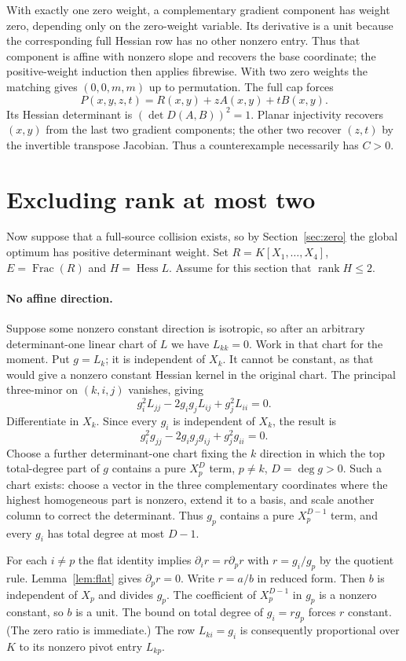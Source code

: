 \documentclass[11pt,a4paper]{article}
\newcommand{\Hess}{\operatorname{Hess}}
\newcommand{\rank}{\operatorname{rank}}
\begin{document}
With exactly one zero weight, a complementary gradient component has weight zero, depending only on the zero-weight variable. Its derivative is a unit because the corresponding full Hessian row has no other nonzero entry. Thus that component is affine with nonzero slope and recovers the base coordinate; the positive-weight induction then applies fibrewise. With two zero weights the matching gives $(0,0,m,m)$ up to permutation. The full cap forces
\[
 P(x,y,z,t)=R(x,y)+z A(x,y)+t B(x,y).
\]
Its Hessian determinant is $(\det D(A,B))^2=1$. Planar injectivity recovers $(x,y)$ from the last two gradient components; the other two recover $(z,t)$ by the invertible transpose Jacobian. Thus a counterexample necessarily has $C>0$.


\section{Excluding rank at most two}\label{sec:ranktwo}
Now suppose that a full-source collision exists, so by Section~\ref{sec:zero} the global optimum has positive determinant weight. Set $R=K[X_1,\ldots,X_4]$, $E=\operatorname{Frac}(R)$ and $H=\Hess L$. Assume for this section that $\rank H\le2$.

\paragraph{No affine direction.}
Suppose some nonzero constant direction is isotropic, so after an arbitrary determinant-one linear chart of $L$ we have $L_{kk}=0$. Work in that chart for the moment. Put $g=L_k$; it is independent of $X_k$. It cannot be constant, as that would give a nonzero constant Hessian kernel in the original chart. The principal three-minor on $(k,i,j)$ vanishes, giving
\[
 g_i^2 L_{jj}-2g_ig_j L_{ij}+g_j^2 L_{ii}=0.
\]
Differentiate in $X_k$. Since every $g_i$ is independent of $X_k$, the result is
\[
 g_i^2 g_{jj}-2g_ig_jg_{ij}+g_j^2g_{ii}=0.
\]
Choose a further determinant-one chart fixing the $k$ direction in which the top total-degree part of $g$ contains a pure $X_p^D$ term, $p\ne k$, $D=\deg g>0$. Such a chart exists: choose a vector in the three complementary coordinates where the highest homogeneous part is nonzero, extend it to a basis, and scale another column to correct the determinant. Thus $g_p$ contains a pure $X_p^{D-1}$ term, and every $g_i$ has total degree at most $D-1$.

For each $i\ne p$ the flat identity implies $\partial_i r=r\partial_pr$ with $r=g_i/g_p$ by the quotient rule. Lemma~\ref{lem:flat} gives $\partial_pr=0$. Write $r=a/b$ in reduced form. Then $b$ is independent of $X_p$ and divides $g_p$. The coefficient of $X_p^{D-1}$ in $g_p$ is a nonzero constant, so $b$ is a unit. The bound on total degree of $g_i=rg_p$ forces $r$ constant. (The zero ratio is immediate.) The row $L_{ki}=g_i$ is consequently proportional over $K$ to its nonzero pivot entry $L_{kp}$.
\end{document}
